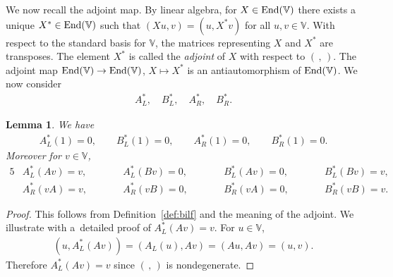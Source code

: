 \documentclass[pdftex]{sigma}
\numberwithin{equation}{section}
\newtheorem{Lemma}[Theorem]{Lemma}
\begin{document}
We now recall the adjoint map. By linear algebra,
for $X \in {\rm End}(\mathbb V)$ there exists a unique
$X^* \in {\rm End}(\mathbb V)$ such that
$(Xu,v) = (u, X^*v)$ for all $u,v \in \mathbb V$.
With respect to the standard basis for $\mathbb V$, the matrices representing
$X$ and $X^*$ are transposes.
The element $X^*$ is called the {\it adjoint} of $X$ with
respect to
$(\, ,\,)$.
The adjoint map
${\rm End}(\mathbb V) \to
{\rm End}(\mathbb V)$,
$X \mapsto X^*$ is an antiautomorphism of
${\rm End}(\mathbb V)$.
We now consider
\begin{gather}
A^*_L, \quad
B^*_L, \quad
A^*_R, \quad
B^*_R.\label{eq:ABLR}
\end{gather}

\begin{Lemma}\label{lem:Asaction}We have
\begin{gather}
A^*_L(1)=0, \qquad
B^*_L(1)=0, \qquad
A^*_R(1)=0, \qquad
B^*_R(1)=0.\label{eq:ABaction}
\end{gather}
Moreover for $v \in \mathbb V$,
\begin{alignat*}{5}
& A^*_L(Av) = v,\qquad &&
A^*_L(Bv) = 0,\qquad &&
B^*_L(Av) = 0,\qquad &&
B^*_L(Bv) = v, &\\
 &A^*_R(vA) = v,\qquad &&
A^*_R(vB) = 0,\qquad &&
B^*_R(vA) = 0,\qquad &&
B^*_R(vB) = v. &
\end{alignat*}
\end{Lemma}
\begin{proof} This follows from
Definition~\ref{def:bilf}
and the meaning of the adjoint.
We illustrate with a~detailed proof of $A^*_L(Av)=v$.
For $u \in \mathbb V$,
\begin{gather*}
(u, A^*_L(Av)) = (A_L(u), Av) = (Au,Av)=(u,v).
\end{gather*}
Therefore $A^*_L(Av)=v$ since $(\,,\,)$ is nondegenerate.
\end{proof}
\end{document}

